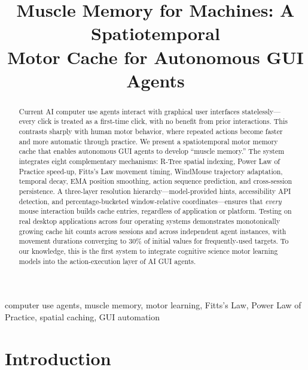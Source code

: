 \documentclass[conference]{IEEEtran}
\begin{document}
\title{Muscle Memory for Machines: A Spatiotemporal\\Motor Cache for Autonomous GUI Agents}

\author{
}

\maketitle

\begin{abstract}
Current AI computer use agents interact with graphical user interfaces statelessly---every click is treated as a first-time click, with no benefit from prior interactions. This contrasts sharply with human motor behavior, where repeated actions become faster and more automatic through practice. We present a spatiotemporal motor memory cache that enables autonomous GUI agents to develop ``muscle memory.'' The system integrates eight complementary mechanisms: R-Tree spatial indexing, Power Law of Practice speed-up, Fitts's Law movement timing, WindMouse trajectory adaptation, temporal decay, EMA position smoothing, action sequence prediction, and cross-session persistence. A three-layer resolution hierarchy---model-provided hints, accessibility API detection, and percentage-bucketed window-relative coordinates---ensures that \emph{every} mouse interaction builds cache entries, regardless of application or platform. Testing on real desktop applications across four operating systems demonstrates monotonically growing cache hit counts across sessions and across independent agent instances, with movement durations converging to 30\% of initial values for frequently-used targets. To our knowledge, this is the first system to integrate cognitive science motor learning models into the action-execution layer of AI GUI agents.
\end{abstract}

\begin{IEEEkeywords}
computer use agents, muscle memory, motor learning, Fitts's Law, Power Law of Practice, spatial caching, GUI automation
\end{IEEEkeywords}

\section{Introduction}
\end{document}
